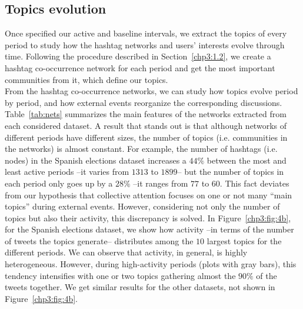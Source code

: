 \subsection{Topics evolution}\label{chp:3:topicsevol}
\label{chp3:2.1}
Once specified our active and baseline intervals, we extract the topics of every period to study how the hashtag networks and users' interests evolve through time. Following the procedure described in  Section~\ref{chp3:1.2}, we create a hashtag co-occurrence network for each period and get the most important communities from it, which define our topics. \\

From the hashtag co-occurrence networks, we can study how topics evolve period by period, and how external events reorganize the corresponding discussions. Table~\ref{tab:nets}  summarizes the main features of the networks extracted from each considered dataset. A result that stands out is that although networks of different periods have different sizes, the number of topics (i.e. communities in the networks) is almost constant.  For example, the number of hashtags (i.e. nodes) in the Spanish elections dataset increases a $44\%$ between the most and least active periods --it varies from $1313$ to $1899$--  but the number of topics in each period only goes up by a $28\%$ --it ranges from $77$ to $60$. This fact deviates from our hypothesis that collective attention focuses on one or not many ``main topics'' during external events. However, considering not only the number of topics but also their activity, this discrepancy is solved. In Figure~\ref{chp3:fig:4b}, for the Spanish elections dataset, we show how activity --in terms of the number of tweets the topics generate-- distributes among the $10$ largest topics for the different periods. We can observe that activity, in general, is highly heterogeneous. However, during high-activity periods (plots with gray bars), this tendency intensifies with one or two topics gathering almost the $90\%$ of the tweets together. We get similar results for the other datasets, not shown in Figure~\ref{chp3:fig:4b}.  \\

